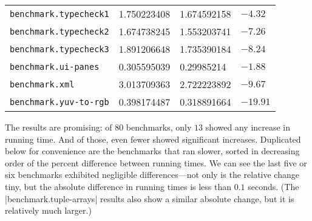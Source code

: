\begin{longtable}{llll}
\texttt{benchmark.typecheck1}               & 1.750223408       & 1.674592158         & $-4.32$     \\
\texttt{benchmark.typecheck2}               & 1.674738245       & 1.553203741         & $-7.26$     \\
\texttt{benchmark.typecheck3}               & 1.891206648       & 1.735390184         & $-8.24$     \\
\texttt{benchmark.ui-panes}                 & 0.305595039       & 0.29985214          & $-1.88$     \\
\texttt{benchmark.xml}                      & 3.013709363       & 2.722223892         & $-9.67$     \\
\texttt{benchmark.yuv-to-rgb}               & 0.398174487       & 0.318891664         & $-19.91$    \\
\end{longtable}

The results are promising: of $80$ benchmarks, only $13$ showed any increase in
running time.  And of those, even fewer showed significant increases.
Duplicated below for convenience are the benchmarks that ran slower, sorted in
decreasing order of the percent difference between running times.  We can see
the last five or six benchmarks exhibited negligible differences---not only is
the relative change tiny, but the absolute difference in running times is less
than $0.1$ seconds.  (The \factor|benchmark.tuple-arrays| results also show a
similar absolute change, but it is relatively much larger.)

